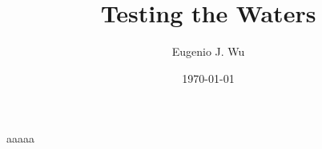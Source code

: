 \documentclass[11pt]{article}
\title{Testing the Waters}
\author{Eugenio J. Wu}
\date{\today}
\begin{document}
\maketitle \pagebreak

\tableofcontents \pagebreak


aaaaa
\end{document}

